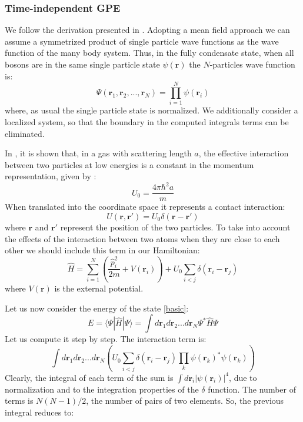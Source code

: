 \documentclass{article}
\begin{document}
\subsubsection*{Time-independent GPE}
We follow the derivation presented in \cite{Pethick}. Adopting a mean field approach we can assume a symmetrized product of single particle wave functions as the wave function of the many body system. Thus, in the fully condensate state, when all bosons are in the same single particle state $\psi(\mathbf{r})$ the $N$-particles wave function is:
\begin{equation} \label{basic}
 \Psi(\mathbf{r}_1,\mathbf{r}_2,...,\mathbf{r}_N)=\prod_{i=1}^{N}\psi(\mathbf{r}_i)
\end{equation}
where, as usual the single particle state is normalized. We additionally consider a localized system, so that the boundary in the computed integrals terms can be eliminated.\par
In \cite{Pethick}, it is shown that, in a gas with scattering length $a$, the effective interaction between two particles at low energies is a constant in the momentum representation, given by :
$$
 U_0=\frac{4 \pi \hbar^2a}{m}
$$
When translated into the coordinate space it represents a contact interaction:
$$
 U(\mathbf{r},\mathbf{r}')=U_0 \delta(\mathbf{r}-\mathbf{r}')
$$
where $\mathbf{r}$ and $\mathbf{r}'$ represent the position of the two particles. To take into account the effects of the interaction between two atoms when they are close to each other we should include this term in our Hamiltonian:
$$
 \hat{H}=\sum_{i=1}^N \left(\frac{\hat{p}_i^2}{2m}+V(\mathbf{r}_i)\right)+U_0\sum_{i<j}\delta(\mathbf{r}_i-\mathbf{r}_j)
$$
where $V(\mathbf{r})$ is the external potential.\par
Let us now consider the energy of the state \eqref{basic}:
\begin{equation}\label{En_Statev}
 E=\langle\Psi|\hat{H}|\Psi\rangle=\int d\mathbf{r}_1 d\mathbf{r}_2 ... d\mathbf{r}_N \Psi^{*}\hat{H}\Psi
\end{equation}
Let us compute it step by step. The interaction term is:
$$
\int  d\mathbf{r}_1 d\mathbf{r}_2 ... d\mathbf{r}_N \left( U_0\sum_{i<j}\delta(\mathbf{r}_i-\mathbf{r}_j)\prod_{k}\psi(\mathbf{r}_k)^{*}\psi(\mathbf{r}_k)\right)
$$
Clearly, the integral of each term of the sum is $\int d\mathbf{r}_i |\psi(\mathbf{r}_i)|^4$, due to normalization and to the integration properties of the $\delta$ function. The number of terms is $N(N-1)/2$, the number of pairs of two elements. So, the previous integral reduces to:
\end{document}
